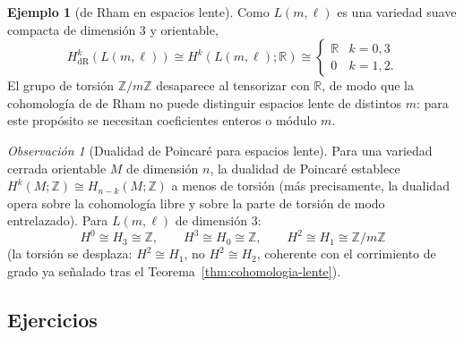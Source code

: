 \documentclass[11pt,a4paper]{article}
\theoremstyle{plain}
\theoremstyle{definition}
\newtheorem{example}[theorem]{Ejemplo}
\theoremstyle{remark}
\newtheorem{remark}[theorem]{Observación}
\newcommand{\RR}{\mathbb R}
\newcommand{\ZZ}{\mathbb Z}
\begin{document}
\begin{example}[de Rham en espacios lente]
\label{ex:derham-lente}
Como $L(m,\ell)$ es una variedad suave compacta de dimensión $3$ y
orientable,
\[
H^k_{\mathrm{dR}}(L(m,\ell))\cong H^k(L(m,\ell);\RR)\cong\begin{cases}\RR & k=0,3\\0 & k=1,2.\end{cases}
\]
El grupo de torsión $\ZZ/m\ZZ$ desaparece al tensorizar con $\RR$, de modo
que la cohomología de de Rham no puede distinguir espacios lente de
distintos $m$: para este propósito se necesitan coeficientes enteros o
módulo $m$.
\end{example}

\begin{remark}[Dualidad de Poincaré para espacios lente]
\label{obs:dualidad-poincare-lente}
Para una variedad cerrada orientable $M$ de dimensión $n$, la dualidad de
Poincaré establece $H^k(M;\ZZ)\cong H_{n-k}(M;\ZZ)$ a menos de torsión (más
precisamente, la dualidad opera sobre la cohomología libre y sobre la
parte de torsión de modo entrelazado). Para $L(m,\ell)$ de dimensión $3$:
\[
H^0\cong H_3\cong\ZZ, \qquad H^3\cong H_0\cong\ZZ, \qquad H^2\cong H_1\cong\ZZ/m\ZZ
\]
(la torsión se desplaza: $H^2\cong H_1$, no $H^2\cong H_2$, coherente con
el corrimiento de grado ya señalado tras el
Teorema~\ref{thm:cohomologia-lente}).
\end{remark}

\subsection*{Ejercicios}
\end{document}

